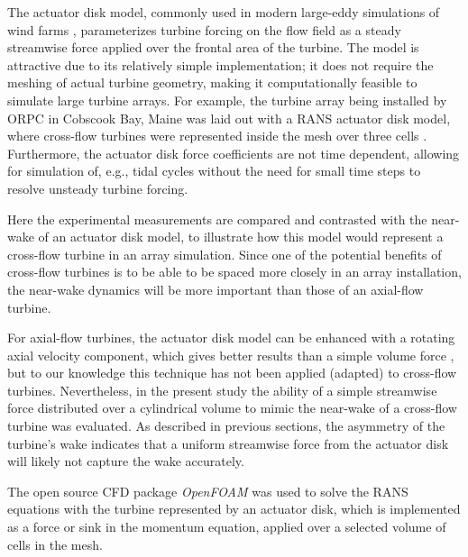 The actuator disk model, commonly used in modern large-eddy simulations of wind
farms \cite{Stevens2014}, parameterizes turbine forcing on the flow field as a
steady streamwise force applied over the frontal area of the turbine. The model
is attractive due to its relatively simple implementation; it does not require
the meshing of actual turbine geometry, making it computationally feasible to
simulate large turbine arrays. For example, the turbine array being installed by
ORPC in Cobscook Bay, Maine was laid out with a RANS actuator disk model, where
cross-flow turbines were represented inside the mesh over three cells
\cite{Nelson2013}. Furthermore, the actuator disk force coefficients are not
time dependent, allowing for simulation of, e.g., tidal cycles without the need
for small time steps to resolve unsteady turbine forcing.

Here the experimental measurements are compared and contrasted with the
near-wake of an actuator disk model, to illustrate how this model would
represent a cross-flow turbine in an array simulation. Since one of the
potential benefits of cross-flow turbines is to be able to be spaced more
closely in an array installation, the near-wake dynamics will be more important
than those of an axial-flow turbine.

For axial-flow turbines, the actuator disk model can be enhanced with a rotating
axial velocity component, which gives better results than a simple volume force
\cite{Wu2011}, but to our knowledge this technique has not been applied
(adapted) to cross-flow turbines. Nevertheless, in the present study the
ability of a simple streamwise force distributed over a cylindrical volume to
mimic the near-wake of a cross-flow turbine was evaluated. As described in
previous sections, the asymmetry of the turbine's wake indicates that a uniform
streamwise force from the actuator disk will likely not capture the wake
accurately.


The open source CFD package \textit{OpenFOAM} was used to solve the RANS
equations with the turbine represented by an actuator disk, which is
implemented as a force or sink in the momentum equation, applied over a selected
volume of cells in the mesh.

